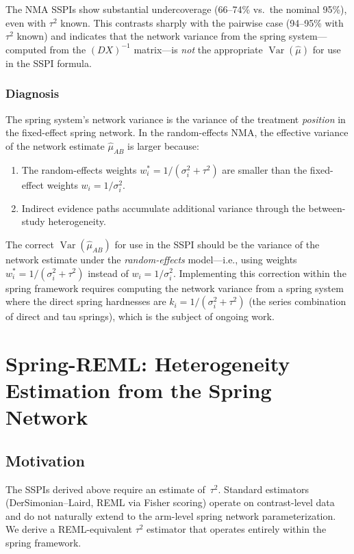 \documentclass[12pt]{article}
\newcommand{\Var}{\operatorname{Var}}
\begin{document}
The NMA SSPIs show substantial undercoverage (66--74\% vs.\ the nominal
95\%), even with $\tau^2$ known.  This contrasts sharply with the
pairwise case (94--95\% with $\tau^2$ known) and indicates that the
network variance from the spring system---computed from the
$(DX)^{-1}$ matrix---is \emph{not} the appropriate $\Var(\hat\mu)$ for
use in the SSPI formula.

\subsubsection{Diagnosis}

The spring system's network variance is the variance of the treatment
\emph{position} in the fixed-effect spring network.  In the
random-effects NMA, the effective variance of the network estimate
$\hat\mu_{AB}$ is larger because:
\begin{enumerate}
  \item The random-effects weights $w_i^* = 1/(\sigma_i^2 + \tau^2)$
    are smaller than the fixed-effect weights $w_i = 1/\sigma_i^2$.
  \item Indirect evidence paths accumulate additional variance through
    the between-study heterogeneity.
\end{enumerate}

The correct $\Var(\hat\mu_{AB})$ for use in the SSPI should be the
variance of the network estimate under the \emph{random-effects}
model---i.e., using weights $w_i^* = 1/(\sigma_i^2 + \tau^2)$ instead
of $w_i = 1/\sigma_i^2$.  Implementing this correction within the
spring framework requires computing the network variance from a spring
system where the direct spring hardnesses are
$k_i = 1/(\sigma_i^2 + \tau^2)$ (the series combination of direct and
tau springs), which is the subject of ongoing work.


\section{Spring-REML: Heterogeneity Estimation from the Spring Network}\label{sec:springreml}

\subsection{Motivation}

The SSPIs derived above require an estimate of~$\tau^2$.  Standard
estimators (DerSimonian--Laird, REML via Fisher scoring) operate on
contrast-level data and do not naturally extend to the arm-level spring
network parameterization.  We derive a REML-equivalent $\tau^2$
estimator that operates entirely within the spring framework.
\end{document}
